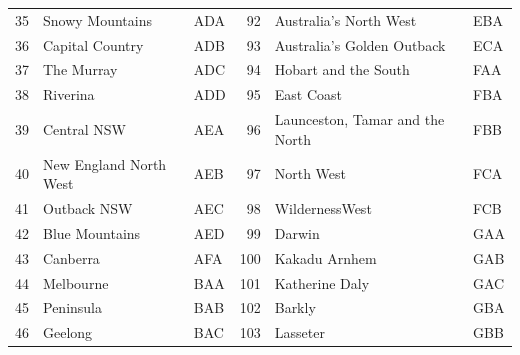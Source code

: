 \documentclass[a4paper,11pt]{article}
\theoremstyle{definition}
\begin{document}
\begin{table}[H]
\begin{tabular}{r l l|r l l}
		35                                   & Snowy Mountains         & ADA            & 92                                              & Australia’s North West          & EBA            \\
		36                                   & Capital Country         & ADB            & 93                                              & Australia’s Golden Outback      & ECA            \\
		37                                   & The Murray              & ADC            & 94                                              & Hobart and the South            & FAA            \\
		38                                   & Riverina                & ADD            & 95                                              & East Coast                      & FBA            \\
		39                                   & Central NSW             & AEA            & 96                                              & Launceston, Tamar and the North & FBB            \\
		40                                   & New England North West  & AEB            & 97                                              & North West                      & FCA            \\
		41                                   & Outback NSW             & AEC            & 98                                              & WildernessWest                  & FCB            \\
		42                                   & Blue Mountains          & AED            & 99                                              & Darwin                          & GAA            \\
		43                                   & Canberra                & AFA            & 100                                             & Kakadu Arnhem                   & GAB            \\
		44                                   & Melbourne               & BAA            & 101                                             & Katherine Daly                  & GAC            \\
		45                                   & Peninsula               & BAB            & 102                                             & Barkly                          & GBA            \\
		46                                   & Geelong                 & BAC            & 103                                             & Lasseter                        & GBB            \\

\end{tabular}
\end{table}
\end{document}
